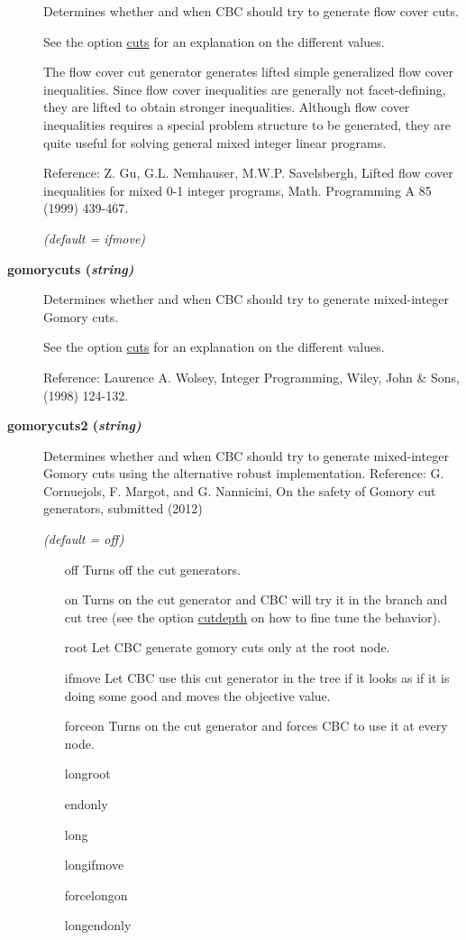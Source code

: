 \begin{description}
Determines whether and when CBC should try to generate flow cover cuts.

See the option \hyperlink{cuts}{cuts} for an explanation on the different values.

The flow cover cut generator generates lifted simple generalized flow cover inequalities.
Since flow cover inequalities are generally not facet-defining, they are lifted to obtain stronger inequalities.
Although flow cover inequalities requires a special problem structure to be generated, they are quite useful for solving general mixed integer linear programs.

Reference: Z. Gu, G.L. Nemhauser, M.W.P. Savelsbergh, Lifted flow cover inequalities for mixed 0-1 integer programs, Math. Programming A 85 (1999) 439-467.

\textsl{(default = ifmove)}

\item[\label{gomorycuts}\hypertarget{gomorycuts}
{\textbf{gomorycuts (\slshape{string})}}]\hspace{1.0in}

Determines whether and when CBC should try to generate mixed-integer Gomory cuts.

See the option \hyperlink{cuts}{cuts} for an explanation on the different values.

Reference: Laurence A. Wolsey, Integer Programming, Wiley, John \& Sons, (1998) 124-132.

\item[\label{gomorycuts2}\hypertarget{gomorycuts2}
{\textbf{gomorycuts2 (\slshape{string})}}]\hspace{1.0in}

Determines whether and when CBC should try to generate mixed-integer Gomory cuts using the alternative robust implementation.
Reference: G. Cornuejols, F. Margot, and G. Nannicini, On the safety of Gomory cut generators, submitted (2012)

\textsl{(default = off)}
\begin{itemize}
\item[off] 
Turns off the cut generators.
\item[on] 
Turns on the cut generator and CBC will try it in the branch and cut tree (see the option \hyperlink{cutdepth}{cutdepth} on how to fine tune the behavior).
\item[root] 
Let CBC generate gomory cuts only at the root node.
\item[ifmove] 
Let CBC use this cut generator in the tree if it looks as if it is doing some good and moves the objective value.
\item[forceon] 
Turns on the cut generator and forces CBC to use it at every node.
\item[longroot]
\item[endonly]
\item[long]
\item[longifmove]
\item[forcelongon]
\item[longendonly]
\end{itemize}


\end{description}
